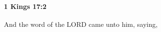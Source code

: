 
		\paragraph{1 Kings 17:2} %
			\label{1KINGS-17-2}

			And the word of the LORD came unto him, saying,


